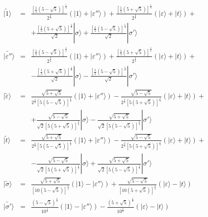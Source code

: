 \documentclass[a4paper,12pt]{report}
\begin{document}
\begin{eqnarray*}
|\tilde{1}\rangle &=&\frac{\left[\frac{1}{5}\left(5-\sqrt{5} \right)
\right]^{\frac{1}{4}}}{2^{\frac{3}{4}}}\left(| 1\rangle +| \varepsilon ''\rangle
\right)+\frac{\left[\frac{1}{5}\left(5+\sqrt{5} \right)
\right]^{\frac{1}{4}}}{2^{\frac{3}{4}}}\left(| \varepsilon \rangle +\mid t\rangle \right)+ \\
&& +\frac{\left[\frac{1}{5}\left(5+\sqrt{5} \right) \right]^{\frac{1}{4}}}{\sqrt{2}}|\sigma \rangle
+\frac{\left[\frac{1}{5}\left(5-\sqrt{5} \right)
\right]^{\frac{1}{4}}}{\sqrt{2}}| \sigma' \rangle \\
|\tilde{\varepsilon''}\rangle &=& \frac{\left[\frac{1}{5}\left(5-\sqrt{5} \right)
\right]^{\frac{1}{4}}}{2^{\frac{3}{4}}}\left(| 1\rangle +| \varepsilon ''\rangle
\right)+\frac{\left[\frac{1}{5}\left(5+\sqrt{5} \right) \right]^{\frac{1}{4}}}{2^{\frac{3}{4}}}\left(|
\varepsilon \rangle +| t\rangle  \right)+ \\
&&-\frac{\left[\frac{1}{5}\left(5+\sqrt{5} \right) \right]^{\frac{1}{4}}}{\sqrt{2}}| \sigma \rangle
-\frac{\left[\frac{1}{5}\left(5-\sqrt{5} \right) \right]^{\frac{1}{4}}}{\sqrt{2}}| \sigma' \rangle
 \\
|\tilde{\varepsilon}\rangle &=&\frac{\sqrt{5+\sqrt{5}} }{2^{\frac{3}{4}}\left[5\left(5-\sqrt{5} \right)
\right]^{\frac{1}{4}}}\left(| 1\rangle +| \varepsilon ''\rangle  \right)-\frac{\sqrt{5-\sqrt{5}}
}{2^{\frac{3}{4}}\left[5\left(5+\sqrt{5} \right) \right]^{\frac{1}{4}}}\left(| \varepsilon \rangle +| t\rangle
\right) + \\
&&+\frac{\sqrt{5-\sqrt{5}} }{\sqrt{2}\left[5\left(5+\sqrt{5} \right) \right]^{\frac{1}{4}}}| \sigma
\rangle-\frac{\sqrt{5+\sqrt{5}} }{\sqrt{2}\left[5\left(5-\sqrt{5} \right) \right]^{\frac{1}{4}}}| \sigma' \rangle
 \\
| \tilde{t}\rangle &=&\frac{\sqrt{5+\sqrt{5}} }{2^{\frac{3}{4}}\left[5\left(5-\sqrt{5} \right)
\right]^{\frac{1}{4}}}\left(| 1\rangle +|\varepsilon ''\rangle  \right)-\frac{\sqrt{5-\sqrt{5}}
}{2^{\frac{3}{4}}\left[5\left(5+\sqrt{5} \right) \right]^{\frac{1}{4}}}\left(| \varepsilon \rangle +| t\rangle
\right)+ \\
&&-\frac{\sqrt{5-\sqrt{5}} }{\sqrt{2}\left[5\left(5+\sqrt{5} \right) \right]^{\frac{1}{4}}}| \sigma
\rangle+\frac{\sqrt{5+\sqrt{5}} }{\sqrt{2}\left[5\left(5-\sqrt{5} \right) \right]^{\frac{1}{4}}}| \sigma' \rangle
 \\
| \tilde{\sigma }\rangle &=& \frac{\sqrt{5+\sqrt{5}}}{\left[10\left(5-\sqrt{5} \right)
\right]^{\frac{1}{4}}}\left(| 1\rangle -| \varepsilon ''\rangle
\right)+\frac{\sqrt{5-\sqrt{5}}}{\left[10\left(5+\sqrt{5} \right) \right]^{\frac{1}{4}}}\left(| \varepsilon
\rangle -| t\rangle  \right)
 \\
|\tilde{\sigma' }\rangle &=&\frac{\left(5-\sqrt{5} \right)^{\frac{1}{4}}}{10^{\frac{1}{4}}} \left(| 1\rangle -|
\varepsilon ''\rangle \right)-\frac{\left(5+\sqrt{5} \right)^{\frac{1}{4}}}{10^{\frac{1}{4}}} \left(| \varepsilon
\rangle -| t\rangle \right)
\end{eqnarray*}
\end{document}
